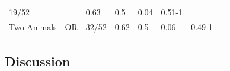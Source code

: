 \documentclass[oneside]{report}
\theoremstyle{definition}
\theoremstyle{definition}
\theoremstyle{definition}
\theoremstyle{remark}
\begin{document}
\begin{longtable}[]{@{}lllllll@{}}
\begin{minipage}[t]{0.19\columnwidth}
19/52\strut
\end{minipage} & \begin{minipage}[t]{0.08\columnwidth}\raggedright\strut
0.63\strut
\end{minipage} & \begin{minipage}[t]{0.08\columnwidth}\raggedright\strut
0.5\strut
\end{minipage} & \begin{minipage}[t]{0.08\columnwidth}\raggedright\strut
0.04\strut
\end{minipage} & \begin{minipage}[t]{0.08\columnwidth}\raggedright\strut
0.51-1\strut
\end{minipage} & \begin{minipage}[t]{0.08\columnwidth}\raggedright\strut
\strut
\end{minipage}\tabularnewline
\begin{minipage}[t]{0.23\columnwidth}\raggedright\strut
Two Animals - OR\strut
\end{minipage} & \begin{minipage}[t]{0.19\columnwidth}\raggedright\strut
32/52\strut
\end{minipage} & \begin{minipage}[t]{0.08\columnwidth}\raggedright\strut
0.62\strut
\end{minipage} & \begin{minipage}[t]{0.08\columnwidth}\raggedright\strut
0.5\strut
\end{minipage} & \begin{minipage}[t]{0.08\columnwidth}\raggedright\strut
0.06\strut
\end{minipage} & \begin{minipage}[t]{0.08\columnwidth}\raggedright\strut
0.49-1\strut
\end{minipage} & \begin{minipage}[t]{0.08\columnwidth}\raggedright\strut
\strut
\end{minipage}\tabularnewline
\bottomrule
\end{longtable}
\subsection{Discussion}\label{discussion-3}
\end{document}
